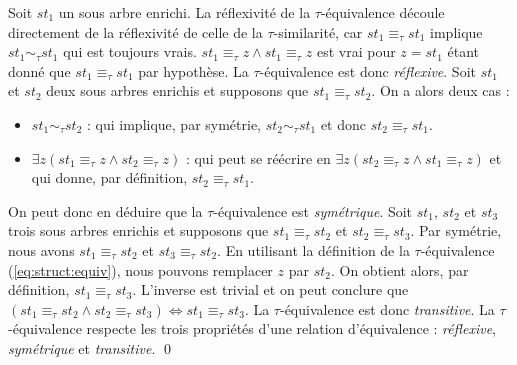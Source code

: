 \begin{proposition}
    Soit $st_1$ un sous arbre enrichi.
    La réflexivité de la $\tau$-équivalence découle directement de la réflexivité de celle de la $\tau$-similarité, car $st_1 \equiv_\tau st_1$ implique $st_1 \sim_\tau st_1$ qui est toujours vrais.
    $st_1 \equiv_\tau z \land st_1 \equiv_\tau z$ est vrai pour $z = st_1$ étant donné que $st_1 \equiv_\tau st_1$ par hypothèse.
    La $\tau$-équivalence est donc \emph{réflexive}.
    Soit $st_1$ et $st_2$ deux sous arbres enrichis et supposons que $st_1 \equiv_\tau st_2$.
    On a alors deux cas :
    \begin{itemize}
        \item $st_1 \sim_\tau st_2$ : qui implique, par symétrie, $st_2 \sim_\tau st_1$ et donc $st_2 \equiv_\tau st_1$.
        \item $\exists z (st_1 \equiv_\tau z \land st_2 \equiv_\tau z)$ : qui peut se réécrire en $\exists z (st_2 \equiv_\tau z \land st_1 \equiv_\tau z)$ et qui donne, par définition, $st_2 \equiv_\tau st_1$.
    \end{itemize}
    On peut donc en déduire que la $\tau$-équivalence est \emph{symétrique}.
    Soit $st_1$, $st_2$ et $st_3$ trois sous arbres enrichis et supposons que $st_1 \equiv_\tau st_2$ et $st_2 \equiv_\tau st_3$.
    Par symétrie, nous avons $st_1 \equiv_\tau st_2$ et $st_3 \equiv_\tau st_2$.
    En utilisant la définition de la $\tau$-équivalence (\ref{eq:struct:equiv}), nous pouvons remplacer $z$ par $st_2$.
    On obtient alors, par définition, $st_1 \equiv_\tau st_3$.
    L'inverse est trivial et on peut conclure que $(st_1 \equiv_\tau st_2 \land st_2 \equiv_\tau st_3) \iff st_1 \equiv_\tau st_3$.
    La $\tau$-équivalence est donc \emph{transitive}.
    La $\tau$-équivalence respecte les trois propriétés d'une relation d'équivalence : \emph{réflexive}, \emph{symétrique} et \emph{transitive}.
    \qed
\end{proposition}

